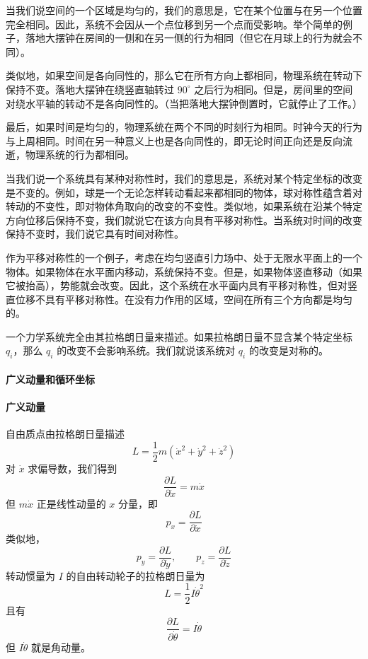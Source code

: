 当我们说空间的一个区域是均匀的，我们的意思是，它在某个位置与在另一个位置完全相同。因此，系统不会因从一个点位移到另一个点而受影响。举个简单的例子，落地大摆钟在房间的一侧和在另一侧的行为相同（但它在月球上的行为就会不同）。

类似地，如果空间是各向同性的，那么它在所有方向上都相同，物理系统在转动下保持不变。落地大摆钟在绕竖直轴转过 $90^\circ$ 之后行为相同。但是，房间里的空间对绕水平轴的转动不是各向同性的。（当把落地大摆钟倒置时，它就停止了工作。）

最后，如果时间是均匀的，物理系统在两个不同的时刻行为相同。时钟今天的行为与上周相同。时间在另一种意义上也是各向同性的，即无论时间正向还是反向流逝，物理系统的行为都相同。

当我们说一个系统具有某种对称性时，我们的意思是，系统对某个特定坐标的改变是不变的。例如，球是一个无论怎样转动看起来都相同的物体，球对称性蕴含着对转动的不变性，即对物体角取向的改变的不变性。类似地，如果系统在沿某个特定方向位移后保持不变，我们就说它在该方向具有平移对称性。当系统对时间的改变保持不变时，我们说它具有时间对称性。

作为平移对称性的一个例子，考虑在均匀竖直引力场中、处于无限水平面上的一个物体。如果物体在水平面内移动，系统保持不变。但是，如果物体竖直移动（如果它被抬高），势能就会改变。因此，这个系统在水平面内具有平移对称性，但对竖直位移不具有平移对称性。在没有力作用的区域，空间在所有三个方向都是均匀的。

一个力学系统完全由其拉格朗日量来描述。如果拉格朗日量不显含某个特定坐标 $q_i$，那么 $q_i$ 的改变不会影响系统。我们就说该系统对 $q_i$ 的改变是对称的。

\paragraph{广义动量和循环坐标}
\paragraph{广义动量}
自由质点由拉格朗日量描述
\begin{equation}\label{eq:1.Lfree}
L = \frac{1}{2}m(\dot{x}^2 + \dot{y}^2 + \dot{z}^2)
\end{equation}
对 $\dot{x}$ 求偏导数，我们得到
\begin{equation*}
\frac{\partial L}{\partial \dot{x}} = m\dot{x}
\end{equation*}
但 $m\dot{x}$ 正是线性动量的 $x$ 分量，即
\begin{equation*}
p_x = \frac{\partial L}{\partial \dot{x}}
\end{equation*}
类似地，
\begin{equation*}
p_y = \frac{\partial L}{\partial \dot{y}}, \qquad p_z = \frac{\partial L}{\partial \dot{z}}
\end{equation*}
转动惯量为 $I$ 的自由转动轮子的拉格朗日量为
\begin{equation*}
L = \frac{1}{2}I\dot{\theta}^2
\end{equation*}
且有
\begin{equation*}
\frac{\partial L}{\partial \dot{\theta}} = I\dot{\theta}
\end{equation*}
但 $I\dot{\theta}$ 就是角动量。

